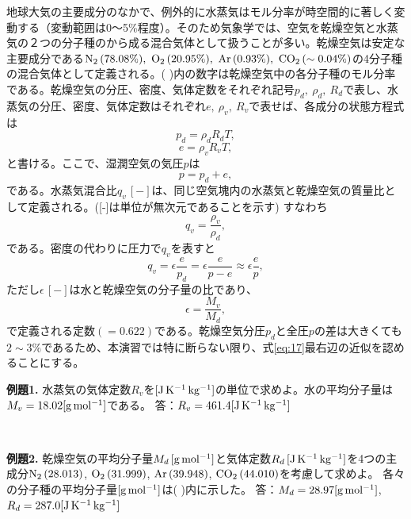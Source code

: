 \documentclass{ltjsarticle}
\begin{document}
地球大気の主要成分のなかで、例外的に水蒸気はモル分率が時空間的に著しく変動する（変動範囲は0～5\%程度）。そのため気象学では、空気を乾燥空気と水蒸気の２つの分子種のから成る混合気体として扱うことが多い。乾燥空気は安定な主要成分である$\rm{N_{2}}\,(78.08\%),\ \rm{O_{2}}\,(20.95\%),\ \rm{Ar}\,(0.93\%),\ \rm{CO_{2}}\,(\sim0.04\%)$の4分子種の混合気体として定義される。( )内の数字は乾燥空気中の各分子種のモル分率である。乾燥空気の分圧、密度、気体定数をそれぞれ記号$p_{d},\ \rho_{d},\ R_{d}$で表し、水蒸気の分圧、密度、気体定数はそれぞれ$e,\ \rho_{v},\ R_{v}$で表せば、各成分の状態方程式は
\begin{equation}\label{eq:13}
 p_{d}=\rho_{d}R_{d}T,
\end{equation}
\begin{equation}\label{eq:14}
 e=\rho_{v}R_{v}T,
\end{equation}
と書ける。ここで、湿潤空気の気圧$p$は
\begin{equation}\label{eq:15}
 p=p_{d}+e,
\end{equation}
である。水蒸気混合比$q_{v}\,[-]$は、同じ空気塊内の水蒸気と乾燥空気の質量比として定義される。([-]は単位が無次元であることを示す) すなわち
\begin{equation}\label{eq:16}
 q_{v}=\frac{\rho_{v}}{\rho_{d}},
\end{equation}
である。密度の代わりに圧力で$q_{v}$を表すと
\begin{equation}\label{eq:17}
 q_{v}=\epsilon\frac{e}{p_{d}}=\epsilon\frac{e}{p-e}\approx\epsilon\frac{e}{p},
\end{equation}
ただし$\epsilon\,[-]$は水と乾燥空気の分子量の比であり、
\begin{equation}\label{eq:18}
 \epsilon=\frac{M_{v}}{M_{d}},
\end{equation}
で定義される定数$(= 0.622)$である。乾燥空気分圧$p_{d}$と全圧$p$の差は大きくても$2 \sim 3\%$であるため、本演習では特に断らない限り、式\eqref{eq:17}最右辺の近似を認めることにする。
\\
\begin{itembox}[l]{\bf{例題1.}}
水蒸気の気体定数$R_{v}$を$[\rm{J\,K^{-1}\,kg^{-1}}]$の単位で求めよ。水の平均分子量は$M_{v}=18.02[\rm{g\,mol^{-1}}]$である。
答：$R_{v}=461.4[\rm{J\,K^{-1}\,kg^{-1}}]$
\end{itembox}
\\
\begin{itembox}[l]{\bf{例題2.}}
乾燥空気の平均分子量$M_{d}\,\rm{[g\,mol^{-1}]}$と気体定数$R_{d}\,\rm{[J\,K^{-1}\,kg^{-1}]}$を4つの主成分$\rm{N_{2}\,(28.013)}$, $\rm{O_{2}\,(31.999)}$, $\rm{Ar \,(39.948)}$, $\rm{CO_{2}\,(44.010)}$を考慮して求めよ。 各々の分子種の平均分子量$\rm{[g\,mol^{-1}]}$は( )内に示した。
答：$M_{d}=28.97[\rm{g\,mol^{-1}}]$, $R_{d}=287.0[\rm{J\,K^{-1}\,kg^{-1}}]$
\end{itembox}
\\
\\
\end{document}
